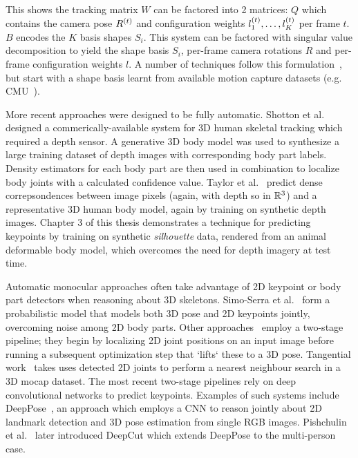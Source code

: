 
    This shows the tracking matrix $W$ can be factored into 2 matrices: $Q$ which contains the camera pose $R^{(t)}$ and configuration weights $l_{1}^{(t)}, \dots, l_{K}^{(t)}$ per frame ${t}$. $B$ encodes the $K$ basis shapes $S_{i}$. This system can be factored with singular value decomposition to yield the shape basis $S_{i}$, per-frame camera rotations $R$ and per-frame configuration weights $l$. A number of techniques follow this formulation~\cite{xxx, xxx, xxx}, but start with a shape basis learnt from available motion capture datasets (e.g. CMU~\cite{xxx}).

    More recent approaches were designed to be fully automatic. Shotton et al.~\cite{kinectpaper} designed a commerically-available system for 3D human skeletal tracking which required a depth sensor. A generative 3D body model was used to synthesize a large training dataset of depth images with corresponding body part labels. Density estimators for each body part are then used in combination to localize body joints with a calculated confidence value. Taylor et al.~\cite{taylor2012vitruvian} predict dense correpsondences between image pixels (again, with depth so in ${\mathbb{R}^{3}}$) and a representative 3D human body model, again by training on synthetic depth images. Chapter 3 of this thesis demonstrates a technique for predicting keypoints by training on synthetic \emph{silhouette} data, rendered from an animal deformable body model, which overcomes the need for depth imagery at test time.

    Automatic monocular approaches often take advantage of 2D keypoint or body part detectors when reasoning about 3D skeletons. Simo-Serra et al.~\cite{xxx, xxx} form a probabilistic model that models both 3D pose and 2D keypoints jointly, overcoming noise among 2D body parts. Other approaches~\cite{xxx, xxx} employ a two-stage pipeline; they begin by localizing 2D joint positions on an input image before running a subsequent optimization step that `lifts` these to a 3D pose. Tangential work~\cite{xxx} takes uses detected 2D joints to perform a nearest neighbour search in a 3D mocap dataset. The most recent two-stage pipelines rely on deep convolutional networks to predict keypoints. Examples of such systems include DeepPose~\cite{toshev2014deeppose}, an approach which employs a CNN to reason jointly about 2D landmark detection and 3D pose estimation from single RGB images. Pishchulin et al.~\cite{pishchulin2016deepcut} later introduced DeepCut which extends DeepPose to the multi-person case.

